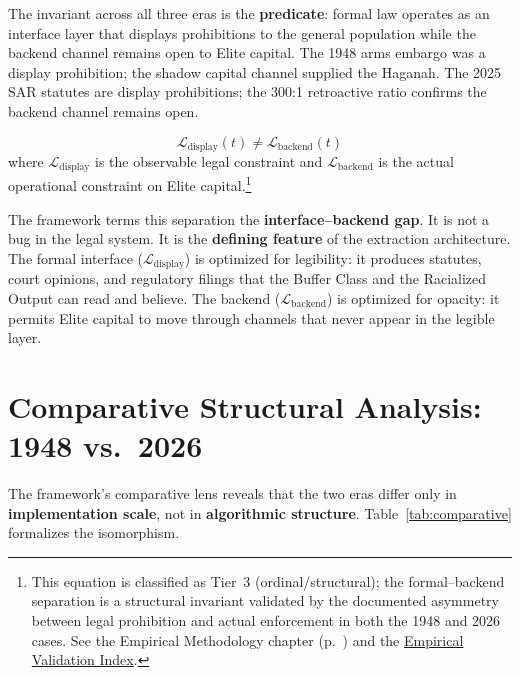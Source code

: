 The invariant across all three eras is the \textbf{predicate}: formal law operates as an interface layer that displays prohibitions to the general population while the backend channel remains open to Elite capital. The 1948 arms embargo was a display prohibition; the shadow capital channel supplied the Haganah. The 2025 SAR statutes are display prohibitions; the 300:1 retroactive ratio confirms the backend channel remains open.

\begin{equation}\label{eq:gp14-formal-backend-separation}
\mathcal{L}_{\text{display}}(t) \neq \mathcal{L}_{\text{backend}}(t)
\end{equation}
where $\mathcal{L}_{\text{display}}$ is the observable legal constraint and $\mathcal{L}_{\text{backend}}$ is the actual operational constraint on Elite capital.\footnote{This equation is classified as Tier~3 (ordinal/structural); the formal--backend separation is a structural invariant validated by the documented asymmetry between legal prohibition and actual enforcement in both the 1948 and 2026 cases. See the Empirical Methodology chapter (p.~\pageref{ch:empirical_methodology}) and the \hyperref[app:empirical_index]{Empirical Validation Index}.}

The framework terms this separation the \textbf{interface--backend gap}. It is not a bug in the legal system. It is the \textbf{defining feature} of the extraction architecture. The formal interface ($\mathcal{L}_{\text{display}}$) is optimized for legibility: it produces statutes, court opinions, and regulatory filings that the Buffer Class and the Racialized Output can read and believe. The backend ($\mathcal{L}_{\text{backend}}$) is optimized for opacity: it permits Elite capital to move through channels that never appear in the legible layer.

\section{Comparative Structural Analysis: 1948 vs.\ 2026}

The framework's comparative lens reveals that the two eras differ only in \textbf{implementation scale}, not in \textbf{algorithmic structure}. Table~\ref{tab:comparative} formalizes the isomorphism.

